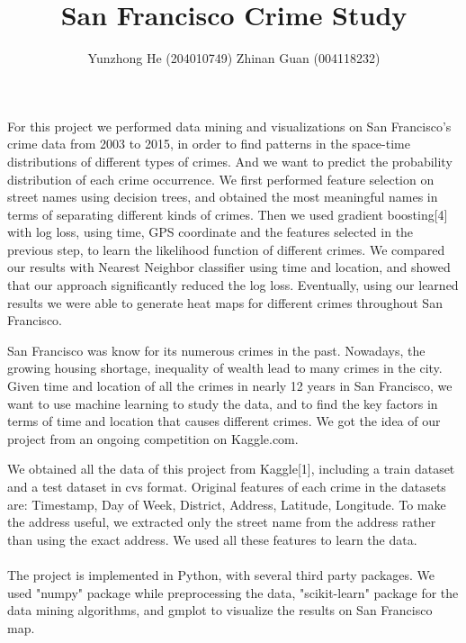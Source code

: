 \documentclass[12pt]{article}
\newenvironment{abs}[2][Part I Abstract]{\begin{trivlist}
\item[\hskip \labelsep {\bfseries #1}\hskip \labelsep {\bfseries #2}]}{\end{trivlist}}
\newenvironment{p1}[2][Part II Motivation]{\begin{trivlist}
\item[\hskip \labelsep {\bfseries #1}\hskip \labelsep {\bfseries #2}]}{\end{trivlist}}
\newenvironment{p2}[2][Part III Data and Software Tools]{\begin{trivlist}
\item[\hskip \labelsep {\bfseries #1}\hskip \labelsep {\bfseries #2}]}{\end{trivlist}}
\begin{document}
 
 
\title{San Francisco Crime Study}
\author{Yunzhong He (204010749) Zhinan Guan (004118232)}
\maketitle

\begin{abs}{}
\item{}
For this project we performed data mining and visualizations on San Francisco's crime data from 2003 to 2015, in order to find patterns in the space-time distributions of different types of crimes. And we want to predict the probability distribution of each crime occurrence. We first performed feature selection on street names using decision trees, and obtained the most meaningful names in terms of separating different kinds of crimes. Then we used gradient boosting[4] with log loss, using time, GPS coordinate and the features selected in the previous step, to learn the likelihood function of different crimes. We compared our results with Nearest Neighbor classifier using time and location, and showed that our approach significantly reduced the log loss. Eventually, using our learned results we were able to generate heat maps for different crimes throughout San Francisco.
\end{abs}

\begin{p1}{}
\item{}
San Francisco was know for its numerous crimes in the past. Nowadays, the growing housing shortage,  inequality of wealth lead to many crimes in the city. Given time and location of all the crimes in nearly 12 years in San Francisco, we want to use machine learning to study the data, and to find the key factors in terms of time and location that causes different crimes. We got the idea of our project from an ongoing competition on Kaggle.com. 
\end{p1}

\begin{p2}{}
\item{}
We obtained all the data of this project from Kaggle[1], including a train dataset and a test dataset in cvs format. Original features of each crime in the datasets are: Timestamp, Day of Week, District, Address, Latitude, Longitude. To make the address useful, we extracted only the street name from the address rather than using the exact address. We used all these features to learn the data.\\\\
The project is implemented in Python, with several third party packages. We used "numpy" package while preprocessing the data, "scikit-learn" package for the data mining algorithms, and gmplot to visualize the results on San Francisco map. 
\end{p2}
\end{document}
